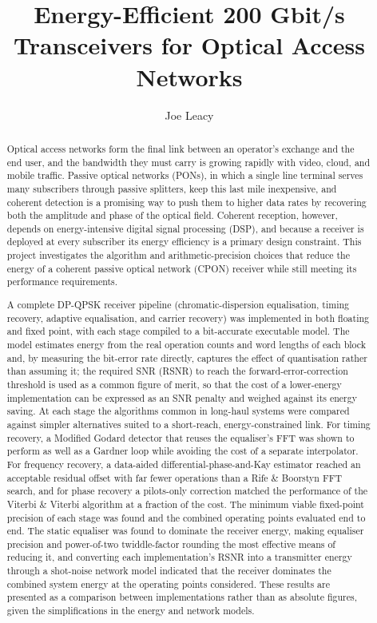\documentclass[12pt,a4paper]{report}
\title{Energy-Efficient 200 Gbit/s Transceivers for Optical Access Networks}
\author{Joe Leacy}
\begin{document}


\begin{abstract}
Optical access networks form the final link between an operator's exchange and the end user, and the bandwidth they must carry is growing rapidly with video, cloud, and mobile traffic. Passive optical networks (PONs), in which a single line terminal serves many subscribers through passive splitters, keep this last mile inexpensive, and coherent detection is a promising way to push them to higher data rates by recovering both the amplitude and phase of the optical field. Coherent reception, however, depends on energy-intensive digital signal processing (DSP), and because a receiver is deployed at every subscriber its energy efficiency is a primary design constraint. This project investigates the algorithm and arithmetic-precision choices that reduce the energy of a coherent passive optical network (CPON) receiver while still meeting its performance requirements.

A complete DP-QPSK receiver pipeline (chromatic-dispersion equalisation, timing recovery, adaptive equalisation, and carrier recovery) was implemented in both floating and fixed point, with each stage compiled to a bit-accurate executable model. The model estimates energy from the real operation counts and word lengths of each block and, by measuring the bit-error rate directly, captures the effect of quantisation rather than assuming it; the required SNR (RSNR) to reach the forward-error-correction threshold is used as a common figure of merit, so that the cost of a lower-energy implementation can be expressed as an SNR penalty and weighed against its energy saving. At each stage the algorithms common in long-haul systems were compared against simpler alternatives suited to a short-reach, energy-constrained link. For timing recovery, a Modified Godard detector that reuses the equaliser's FFT was shown to perform as well as a Gardner loop while avoiding the cost of a separate interpolator. For frequency recovery, a data-aided differential-phase-and-Kay estimator reached an acceptable residual offset with far fewer operations than a Rife \& Boorstyn FFT search, and for phase recovery a pilots-only correction matched the performance of the Viterbi \& Viterbi algorithm at a fraction of the cost. The minimum viable fixed-point precision of each stage was found and the combined operating points evaluated end to end. The static equaliser was found to dominate the receiver energy, making equaliser precision and power-of-two twiddle-factor rounding the most effective means of reducing it, and converting each implementation's RSNR into a transmitter energy through a shot-noise network model indicated that the receiver dominates the combined system energy at the operating points considered. These results are presented as a comparison between implementations rather than as absolute figures, given the simplifications in the energy and network models.
\end{abstract}
\end{document}
